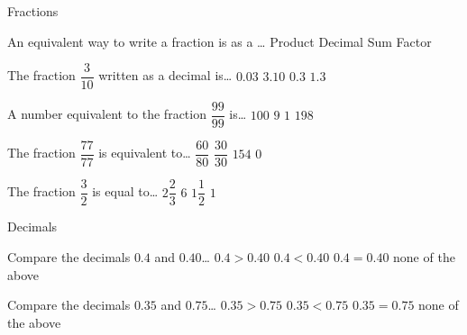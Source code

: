 \documentclass[dvips]{jj_game} %
\begin{document}
\begin{Questions}

\begin{Category}{Fractions}


\begin{Question}

An equivalent way to write a fraction is as a \dots
{} Product
 Decimal
 Sum
 Factor
\end{Question}

\begin{Question}

The fraction $\dfrac{3}{10}$ written as a decimal is\dots
{} $0.03$
 $3.10$
 $0.3$
 $1.3$
\end{Question}

\begin{Question}

A number equivalent to the fraction $\dfrac{99}{99}$ is\dots
{} $100$
 $9$
 $1$
 $198$
\end{Question}

\begin{Question}

The fraction $\dfrac{77}{77}$ is equivalent to\dots
{} $\dfrac{60}{80}$
 $\dfrac{30}{30}$
 $154$
 $0$
\end{Question}

\begin{Question}

The fraction $\dfrac{3}{2}$ is equal to\dots
{} $2\dfrac{2}{3}$
 $6$
 $1\dfrac{1}{2}$  %
 $1$
\end{Question}

\end{Category}


\begin{Category}{Decimals}

\begin{Question}

Compare the decimals $0.4$ and $0.40$\dots
{} $0.4>0.40$
 $0.4<0.40$
 $0.4=0.40$
 none of the above
\end{Question}

\begin{Question}

Compare the decimals $0.35$ and $0.75$\dots
{} $0.35>0.75$
 $0.35<0.75$
 $0.35=0.75$
 none of the above
\end{Question}


\end{Category}
\end{Questions}
\end{document}
